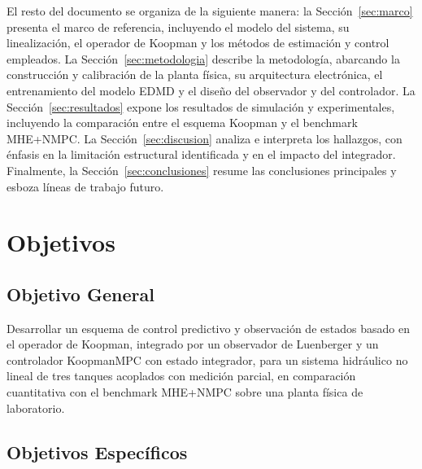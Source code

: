 \documentclass[12pt,letterpaper]{article}
\begin{document}
El resto del documento se organiza de la siguiente manera: la
Sección~\ref{sec:marco} presenta el marco de referencia, incluyendo el modelo del
sistema, su linealización, el operador de Koopman y los métodos de estimación y
control empleados. La Sección~\ref{sec:metodologia} describe la metodología,
abarcando la construcción y calibración de la planta física, su arquitectura
electrónica, el entrenamiento del modelo EDMD y el diseño del observador y del
controlador. La Sección~\ref{sec:resultados} expone los resultados de simulación y
experimentales, incluyendo la comparación entre el esquema Koopman y el benchmark
MHE+NMPC. La Sección~\ref{sec:discusion} analiza e interpreta los hallazgos, con
énfasis en la limitación estructural identificada y en el impacto del integrador.
Finalmente, la Sección~\ref{sec:conclusiones} resume las conclusiones principales y
esboza líneas de trabajo futuro.

\section{Objetivos}
\label{sec:objetivos}

\subsection{Objetivo General}
\label{sec:objetivo_general}

Desarrollar un esquema de control predictivo y
observación de estados basado en el operador de Koopman, integrado por un
observador de Luenberger y un controlador KoopmanMPC con estado integrador, para
un sistema hidráulico no lineal de tres tanques acoplados con medición parcial,
en comparación cuantitativa con el benchmark MHE+NMPC sobre una planta física de
laboratorio.

\subsection{Objetivos Específicos}
\label{sec:objetivos_especificos}
\end{document}
